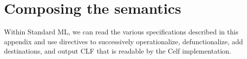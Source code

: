 \bigskip
{}


\section{Composing the semantics}

Within Standard ML, we can read the various specifications described
in this appendix and use directives to successively operationalize,
defunctionalize, add destinations, and output CLF that is readable by
the Celf implementation.

\bigskip
{}
